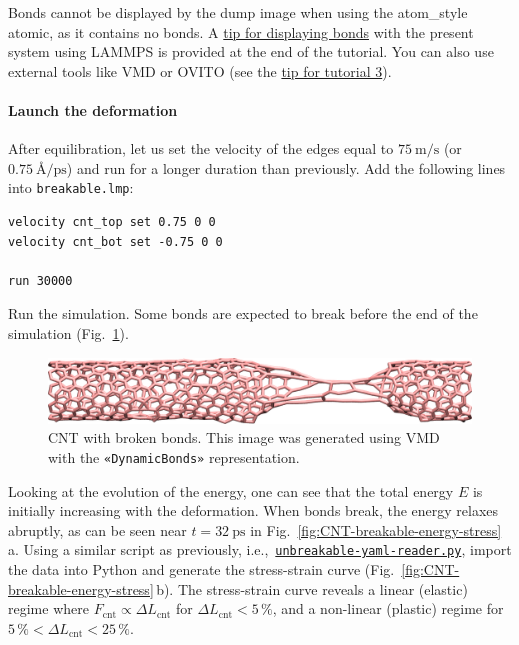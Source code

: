\documentclass[9pt,tutorial]{livecoms}
\newcommand{\lmpcmdnote}[1]{\hspace{0pt}\colorbox{note_listing}{\textcolor{command}{\small{#1}}}\hspace{0pt}} %
\newcommand{\flecmd}[1]{\textcolor{command}{\texttt{#1}}} %
\newcommand{\guicmd}[1]{\textcolor{command}{\texttt{«#1»}}} %
\newcommand{\dwlcmd}[1]{\textcolor{download}{\texttt{#1}}} %
\newcommand{\filepath}{https://raw.githubusercontent.com/lammpstutorials/lammpstutorials-article/main/files/}
\begin{document}
\begin{note}
  Bonds cannot be displayed by the \lmpcmdnote{dump image} when using
  the \lmpcmdnote{atom\_style atomic}, as it contains no bonds.  A
  \hyperref[tip-dynamic-bonds]{tip for displaying bonds} with the
  present system using LAMMPS is provided at the end of the tutorial.
  You can also use external tools like VMD or OVITO (see the
  \hyperref[tip-external-viz]{tip for tutorial 3}).
\end{note}

\paragraph{Launch the deformation}

After equilibration, let us set the velocity of the edges equal to
$75~\text{m/s}$ (or $0.75~\text{\AA{}/ps}$) and run for a longer duration than
previously.  Add the following lines into \flecmd{breakable.lmp}:
\begin{lstlisting}
velocity cnt_top set 0.75 0 0
velocity cnt_bot set -0.75 0 0

run 30000
\end{lstlisting}
Run the simulation.  Some bonds are expected to break before the end of the
simulation (Fig.~\ref{fig:CNT-deformed-breakable}).

\begin{figure}
\centering
\includegraphics[width=\linewidth]{CNT-deformed-breakable}
\caption{CNT with broken bonds.  This image was generated using
VMD~\cite{vmd_home,humphrey1996vmd} with the \guicmd{DynamicBonds} representation.}
\label{fig:CNT-deformed-breakable}
\end{figure}

Looking at the evolution of the energy, one can see that the total
energy $E$ is initially increasing with the deformation.  When bonds
break, the energy relaxes abruptly, as can be seen near $t=32~\text{ps}$
in Fig.~\ref{fig:CNT-breakable-energy-stress}\,a.  Using a similar
script as previously,
i.e.,~\href{\filepath tutorial2/unbreakable-yaml-reader.py}{\dwlcmd{unbreakable-yaml-reader.py}},
import the data into Python and generate the stress-strain curve
(Fig.~\ref{fig:CNT-breakable-energy-stress}\,b).  The stress-strain
curve reveals a linear (elastic) regime where
$F_\text{cnt} \propto \Delta L_\text{cnt}$ for
$\Delta L_\text{cnt} < 5\,\%$, and a non-linear (plastic) regime for
$5\,\% < \Delta L_\text{cnt} < 25\,\%$.
\end{document}
